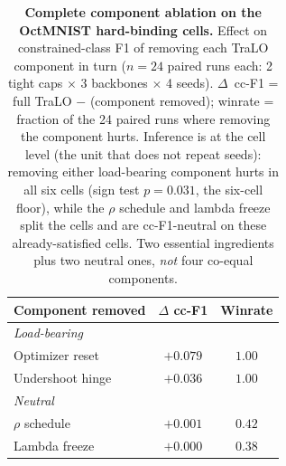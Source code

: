 \begin{table}[t]\centering\small
\caption{\textbf{Complete component ablation on the OctMNIST hard-binding cells.} Effect on constrained-class F1 of removing each TraLO component in turn ($n{=}24$ paired runs each: 2 tight caps $\times$ 3 backbones $\times$ 4 seeds). $\Delta$~cc-F1 = full TraLO $-$ (component removed); winrate = fraction of the 24 paired runs where removing the component hurts. Inference is at the cell level (the unit that does not repeat seeds): removing either load-bearing component hurts in all six cells (sign test $p{=}0.031$, the six-cell floor), while the $\rho$ schedule and lambda freeze split the cells and are cc-F1-neutral on these already-satisfied cells. Two essential ingredients plus two neutral ones, \emph{not} four co-equal components.}
\label{tab:ablation_complete}
\begin{tabular}{l c c}
\toprule
Component removed & $\Delta$ cc-F1 & Winrate \\
\midrule
\multicolumn{3}{l}{\emph{Load-bearing}} \\
Optimizer reset   & $+0.079$ & $1.00$ \\
Undershoot hinge  & $+0.036$ & $1.00$ \\
\midrule
\multicolumn{3}{l}{\emph{Neutral}} \\
$\rho$ schedule   & $+0.001$ & $0.42$ \\
Lambda freeze     & $+0.000$ & $0.38$ \\
\bottomrule
\end{tabular}
\end{table}
